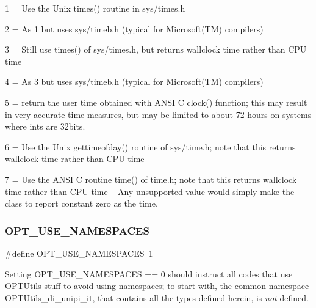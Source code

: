 \begin{DoxyItemize}
\item 1 = Use the Unix times() routine in sys/times.\+h
\item 2 = As 1 but uses sys/timeb.\+h (typical for Microsoft(\+T\+M) compilers)
\item 3 = Still use times() of sys/times.\+h, but returns wallclock time rather than C\+PU time
\item 4 = As 3 but uses sys/timeb.\+h (typical for Microsoft(\+T\+M) compilers)
\item 5 = return the user time obtained with A\+N\+SI C clock() function; this may result in very accurate time measures, but may be limited to about 72 hours on systems where ints are 32bits.
\item 6 = Use the Unix gettimeofday() routine of sys/time.\+h; note that this returns wallclock time rather than C\+PU time ~\newline

\item 7 = Use the A\+N\+SI C routine time() of time.\+h; note that this returns wallclock time rather than C\+PU time ~\newline
 Any unsupported value would simply make the class to report constant zero as the time. 
\end{DoxyItemize}\mbox{\label{group___o_p_t_u_t_i_l_s___m_a_c_r_o_s_ga677c6af9167727c62f3c54e63b5d301c}} 
\subsubsection{\texorpdfstring{O\+P\+T\+\_\+\+U\+S\+E\+\_\+\+N\+A\+M\+E\+S\+P\+A\+C\+ES}{OPT\_USE\_NAMESPACES}}
{\footnotesize\ttfamily \#define O\+P\+T\+\_\+\+U\+S\+E\+\_\+\+N\+A\+M\+E\+S\+P\+A\+C\+ES~1}

Setting O\+P\+T\+\_\+\+U\+S\+E\+\_\+\+N\+A\+M\+E\+S\+P\+A\+C\+ES == 0 should instruct all codes that use O\+P\+T\+Utils stuff to avoid using namespaces; to start with, the common namespace O\+P\+T\+Utils\+\_\+di\+\_\+unipi\+\_\+it, that contains all the types defined herein, is {\itshape not} defined. 